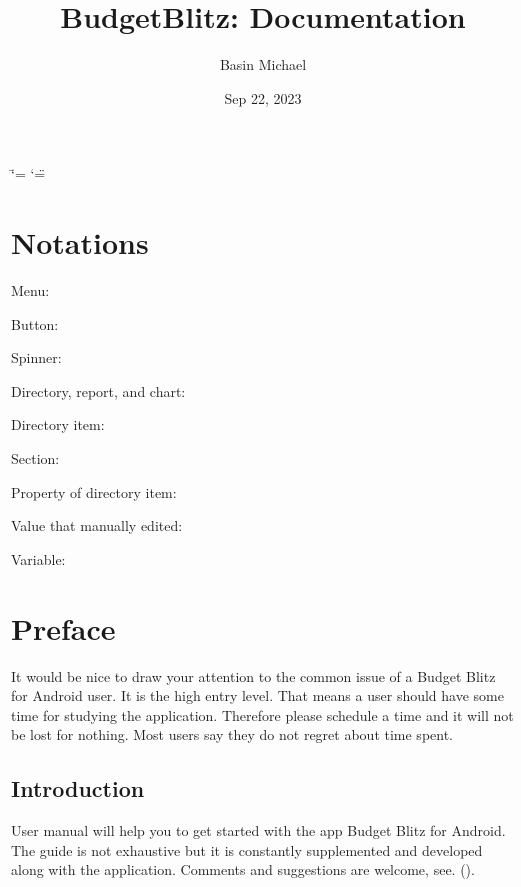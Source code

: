 \documentclass[a4paper,10pt,english]{sphinxmanual}
\title{BudgetBlitz: Documentation}
\date{Sep 22, 2023}
\author{Basin Michael}
\begin{document}
\ifdefined\shorthandoff
  \ifnum\catcode`\=\string=\active\shorthandoff{=}\fi
  \ifnum\catcode`\"=\active{}\fi
\fi

\pagestyle{empty}
\sphinxmaketitle
\pagestyle{plain}
\sphinxtableofcontents
\pagestyle{normal}
\label{\detokenize{index::doc}}


\sphinxstepscope


\chapter{Notations}
\label{\detokenize{notations:notations}}\label{\detokenize{notations::doc}}
\sphinxAtStartPar
Menu: 

\sphinxAtStartPar
Button: 

\sphinxAtStartPar
Spinner: 

\sphinxAtStartPar
Directory, report, and chart: 

\sphinxAtStartPar
Directory item: 

\sphinxAtStartPar
Section: 

\sphinxAtStartPar
Property of directory item: 

\sphinxAtStartPar
Value that manually edited:  

\sphinxAtStartPar
Variable: 

\sphinxstepscope


\chapter{Preface}
\label{\detokenize{preface:preface}}\label{\detokenize{preface::doc}}
\sphinxAtStartPar
It would be nice to draw your attention to the common issue of a Budget Blitz for Android user. It is the high entry level.
That means a user should have some time for studying the application. Therefore please schedule a time
and it will not be lost for nothing. Most users say they do not regret about time spent.


\section{Introduction}
\label{\detokenize{preface:introduction}}
\sphinxAtStartPar
User manual will help you to get started with the app Budget Blitz for Android. The guide is not exhaustive but it is constantly
supplemented and developed along with the application. Comments and suggestions are welcome,
see. {\hyperref[\detokenize{preface:feedback}]{}} ().
\end{document}
